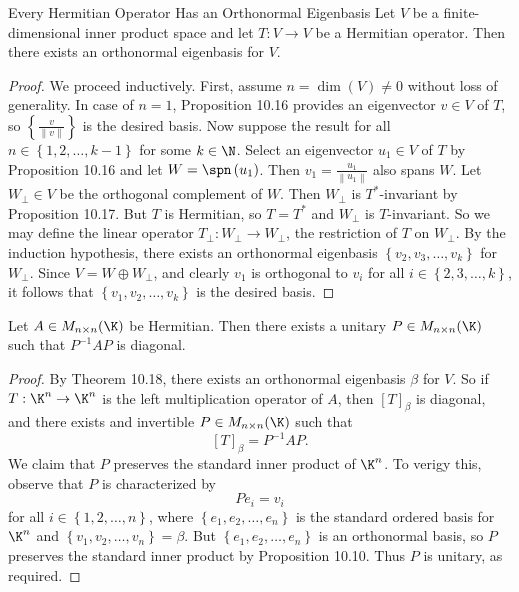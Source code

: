 \documentclass[linearalgebra]{subfiles}
\begin{document}
    \begin{theorem}{Every Hermitian Operator Has an Orthonormal Eigenbasis}
        Let $V$ be a finite-dimensional inner product space and let $T:V\to V$ be a Hermitian operator. Then there exists an orthonormal eigenbasis for $V$.
    \end{theorem}

    \begin{proof}
        We proceed inductively. First, assume $n=\dim(V)\neq 0$ without loss of generality. In case of $n=1$, Proposition 10.16 provides an eigenvector $v\in V$ of $T$, so $\left\lbrace \frac{v}{\left\lVert v\right\rVert } \right\rbrace$ is the desired basis. Now suppose the result for all $n\in\left\lbrace 1,2,\ldots,k-1 \right\rbrace$ for some $k\in\N$. Select an eigenvector $u_1\in V$ of $T$ by Proposition 10.16 and let $W = \spn\left( u_1 \right)$. Then $v_1 = \frac{u_1}{\left\lVert u_1\right\rVert }$ also spans $W$. Let $W_\perp\in V$ be the orthogonal complement of $W$. Then $W_\perp$ is $T^*$-invariant by Proposition 10.17. But $T$ is Hermitian, so $T=T^*$ and $W_\perp$ is $T$-invariant. So we may define the linear operator $T_\perp: W_\perp\to W_\perp$, the restriction of $T$ on $W_\perp$. By the induction hypothesis, there exists an orthonormal eigenbasis $\left\lbrace v_2,v_3,\ldots,v_k \right\rbrace$ for $W_\perp$. Since $V=W\oplus W_\perp$, and clearly $v_1$ is orthogonal to $v_i$ for all $i\in\left\lbrace 2,3,\ldots,k \right\rbrace$, it follows that $\left\lbrace v_1,v_2,\ldots,v_k \right\rbrace$ is the desired basis.
    \end{proof}

    \begin{cor}{}
        Let $A\in M_{n\times n}(\K)$ be Hermitian. Then there exists a unitary $P\in M_{n\times n}(\K)$ such that $P^{-1}AP$ is diagonal.
    \end{cor}	

    \begin{proof}
        By Theorem 10.18, there exists an orthonormal eigenbasis $\beta$ for $V$. So if $T:\K^n\to\K^n$ is the left multiplication operator of $A$, then $\left[ T \right] _\beta$ is diagonal, and there exists and invertible $P\in M_{n\times n}(\K)$ such that 
        \begin{equation*}
            \left[ T \right] _\beta = P^{-1}AP.
        \end{equation*}
        We claim that $P$ preserves the standard inner product of $\K^n$. To verigy this, observe that $P$ is characterized by
        \begin{equation*}
            Pe_i = v_i
        \end{equation*}
        for all $i\in\left\lbrace 1,2,\ldots,n \right\rbrace$, where $\left\lbrace e_1,e_2,\ldots,e_n \right\rbrace$ is the standard ordered basis for $\K^n$ and $\left\lbrace v_1,v_2,\ldots,v_n \right\rbrace = \beta$. But $\left\lbrace e_1,e_2,\ldots,e_n \right\rbrace$ is an orthonormal basis, so $P$ preserves the standard inner product by Proposition 10.10. Thus $P$ is unitary, as required.
    \end{proof}
\end{document}
